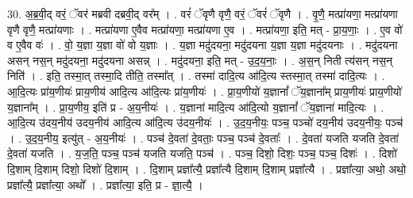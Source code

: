 \documentclass[17pt]{extarticle}
\begin{document}
30. अ॒ब्र॒वी॒द् वरं॒ ॅवर॑ मब्रवी दब्रवी॒द् वर᳚म् । . वरं॑ ॅवृणै वृणै॒ वरं॒ ॅवरं॑ ॅवृणै । . वृ॒णै॒ मत्प्रा॑यणा॒ मत्प्रा॑यणा वृणै वृणै॒ मत्प्रा॑यणाः । . मत्प्रा॑यणा ए॒वैव मत्प्रा॑यणा॒ मत्प्रा॑यणा ए॒व । . मत्प्रा॑यणा॒ इति॒ मत् - प्रा॒य॒णाः॒ । . ए॒व वो॑ व ए॒वैव वः॑ । . वो॒ य॒ज्ञा य॒ज्ञा वो॑ वो य॒ज्ञाः । . य॒ज्ञा मदु॑दयना॒ मदु॑दयना य॒ज्ञा य॒ज्ञा मदु॑दयनाः । . मदु॑दयना असन् नस॒न् मदु॑दयना॒ मदु॑दयना असन्न् । . मदु॑दयना॒ इति॒ मत् - उ॒द॒य॒नाः॒ । . अ॒स॒न् निती त्य॑सन् नस॒न् निति॑ । . इति॒ तस्मा॒त् तस्मा॒दि तीति॒ तस्मा᳚त् । . तस्मा॑ दादि॒त्य आ॑दि॒त्य स्तस्मा॒त् तस्मा॑ दादि॒त्यः । . आ॒दि॒त्यः प्रा॑य॒णीयः॑ प्राय॒णीय॑ आदि॒त्य आ॑दि॒त्यः प्रा॑य॒णीयः॑ । . प्रा॒य॒णीयो॑ य॒ज्ञानां᳚ ॅय॒ज्ञाना᳚म् प्राय॒णीयः॑ प्राय॒णीयो॑ य॒ज्ञाना᳚म् । . प्रा॒य॒णीय॒ इति॑ प्र - अ॒य॒नीयः॑ । . य॒ज्ञाना॑ मादि॒त्य आ॑दि॒त्यो य॒ज्ञानां᳚ ॅय॒ज्ञाना॑ मादि॒त्यः । . आ॒दि॒त्य उ॑दय॒नीय॑ उदय॒नीय॑ आदि॒त्य आ॑दि॒त्य उ॑दय॒नीयः॑ । . उ॒द॒य॒नीयः॒ पञ्च॒ पञ्चो॑ दय॒नीय॑ उदय॒नीयः॒ पञ्च॑ । . उ॒द॒य॒नीय॒ इत्यु॑त् - अ॒य॒नीयः॑ । . पञ्च॑ दे॒वता॑ दे॒वताः॒ पञ्च॒ पञ्च॑ दे॒वताः᳚ । . दे॒वता॑ यजति यजति दे॒वता॑ दे॒वता॑ यजति । . य॒ज॒ति॒ पञ्च॒ पञ्च॑ यजति यजति॒ पञ्च॑ । . पञ्च॒ दिशो॒ दिशः॒ पञ्च॒ पञ्च॒ दिशः॑ । . दिशो॑ दि॒शाम् दि॒शाम् दिशो॒ दिशो॑ दि॒शाम् । . दि॒शाम् प्रज्ञा᳚त्यै॒ प्रज्ञा᳚त्यै दि॒शाम् दि॒शाम् प्रज्ञा᳚त्यै । . प्रज्ञा᳚त्या॒ अथो॒ अथो॒ प्रज्ञा᳚त्यै॒ प्रज्ञा᳚त्या॒ अथो᳚ । . प्रज्ञा᳚त्या॒ इति॒ प्र - ज्ञा॒त्यै॒ । \newline
\end{document}
